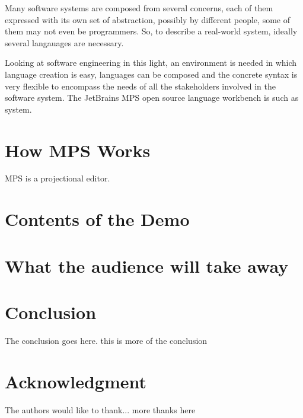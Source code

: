 \documentclass[10pt, conference, compsocconf]{IEEEtran}
\begin{document}
Many software systems are composed from several concerns, each of them expressed
with its own set of abstraction, possibly by different people, some of them may
not even be programmers. So, to describe a real-world system, ideally several
langauages are necessary.

Looking at software engineering in this light, an environment is needed in
which language creation is easy, languages can be composed and the concrete
syntax is very flexible to encompass the needs of all the stakeholders involved
in the software system. The JetBrains MPS open source language workbench is such
as system.

\section{How MPS Works}

MPS is a projectional editor. 


\section{Contents of the Demo}


\section{What the audience will take away}

%
\IEEEpeerreviewmaketitle




\section{Conclusion}
The conclusion goes here. this is more of the conclusion



\section*{Acknowledgment}


The authors would like to thank...
more thanks here
\end{document}
